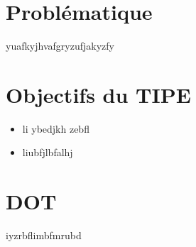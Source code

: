 \documentclass[12pt,a4paper]{extarticle}
\begin{document}
\section*{Problématique}

\indent yuafkyjhvafgryzufjakyzfy

\section*{Objectifs du TIPE}

\begin{itemize}

\item li	ybedjkh	zebfl
\item liubfjlbfalhj

\end{itemize}


\section*{DOT}

iyzrbflimbfmrubd
\end{document}
